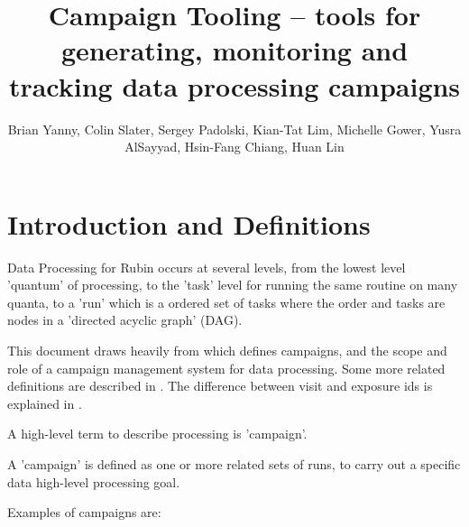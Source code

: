 \documentclass[DM,authoryear,toc]{lsstdoc}
\title{Campaign Tooling -- tools for generating, monitoring and tracking data processing campaigns}
\author{%
Brian Yanny, Colin Slater, Sergey Padolski, Kian-Tat Lim, Michelle Gower, Yusra AlSayyad, Hsin-Fang Chiang, Huan Lin
}
\date{\vcsDate}
\begin{document}
\maketitle


\section{Introduction and Definitions}

Data Processing for Rubin occurs at several levels,
from the lowest level 'quantum' of processing, to the 'task' level 
for running the same routine on many quanta, to a 'run' which is a 
ordered set of tasks where the order and tasks are nodes 
in a 'directed acyclic graph' (DAG).

This document draws heavily from \cite{DMTN-181} which defines campaigns, and 
the scope and role of a campaign management system for data processing.
Some more related definitions are described in \cite{DMTN-137}.
The difference between visit and exposure ids is explained in \cite{iddefs}.

A high-level term to describe processing is 'campaign'.

A 'campaign' is defined as one or more related sets of runs, to carry out a
specific data high-level processing goal.  

Examples of campaigns are:
\end{document}
